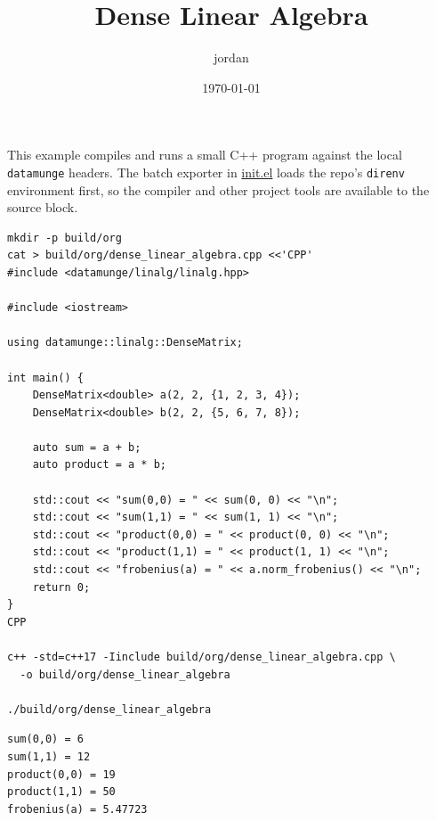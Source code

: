 \documentclass[11pt]{article}
\author{jordan}
\date{\today}
\title{Dense Linear Algebra}
\begin{document}
\maketitle
This example compiles and runs a small C++ program against the local
\texttt{datamunge} headers. The batch exporter in \href{../../init.el}{init.el}
loads the repo's \texttt{direnv} environment first, so the compiler and other project
tools are available to the source block.

\begin{verbatim}
mkdir -p build/org
cat > build/org/dense_linear_algebra.cpp <<'CPP'
#include <datamunge/linalg/linalg.hpp>

#include <iostream>

using datamunge::linalg::DenseMatrix;

int main() {
    DenseMatrix<double> a(2, 2, {1, 2, 3, 4});
    DenseMatrix<double> b(2, 2, {5, 6, 7, 8});

    auto sum = a + b;
    auto product = a * b;

    std::cout << "sum(0,0) = " << sum(0, 0) << "\n";
    std::cout << "sum(1,1) = " << sum(1, 1) << "\n";
    std::cout << "product(0,0) = " << product(0, 0) << "\n";
    std::cout << "product(1,1) = " << product(1, 1) << "\n";
    std::cout << "frobenius(a) = " << a.norm_frobenius() << "\n";
    return 0;
}
CPP

c++ -std=c++17 -Iinclude build/org/dense_linear_algebra.cpp \
  -o build/org/dense_linear_algebra

./build/org/dense_linear_algebra
\end{verbatim}

\label{orgf0d9f05}
\begin{verbatim}
sum(0,0) = 6
sum(1,1) = 12
product(0,0) = 19
product(1,1) = 50
frobenius(a) = 5.47723
\end{verbatim}
\end{document}
